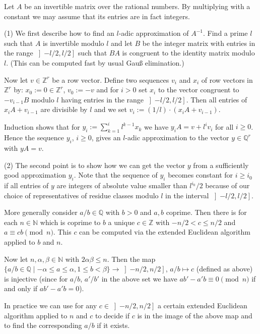 \documentclass[a4paper,11pt]{report}
\begin{document}
{{ Let $A$ be an invertible matrix over the rational numbers. By multiplying with a
constant we may assume that its entries are in fact integers.

 (1) We first describe how to find an $l$-adic approximation of $A^{-1}$. Find a prime $l$ such that $A$ is invertible modulo $l$ and let $B$ be the integer matrix with entries in the range $\left]-l/2,l/2\right]$ such that $BA$ is congruent to the identity matrix modulo $l$. (This can be computed fast by usual Gau{\ss} elimination.)

 Now let $v \in {\ensuremath{\mathbb Z}}^r$ be a row vector. Define two sequences $v_i$ and $x_i$ of row vectors in ${\ensuremath{\mathbb Z}}^r$ by: $x_0 := 0 \in {\ensuremath{\mathbb Z}}^r$, $v_0 := -v$ and for $i > 0$ set $x_i$ to the vector congruent to $-v_{i-1} B$ modulo $l$ having entries in the range $\left]-l/2, l/2\right]$. Then all entries of $x_i A + v_{i-1}$ are divisible by $l$ and we set $v_i := (1/l) \cdot (x_i A + v_{i-1})$.

 Induction shows that for $y_i := \sum_{k=1}^{i} l^{k-1} x_k$ we have $y_i A = v + l^i v_i$ for all $i \geq 0$. Hence the sequence $y_i$, $i \geq 0$, gives an $l$-adic approximation to the vector $y \in {\ensuremath{\mathbb Q}}^r$ with $y A = v$.

 (2) The second point is to show how we can get the vector $y$ from a sufficiently good approximation $y_i$. Note that the sequence of $y_i$ becomes constant for $i \geq i_0$ if all entries of $y$ are integers of absolute value smaller than $l^{i_0} / 2$ because of our choice of representatives of residue classes modulo $l$ in the interval $\left]-l/2, l/2\right]$.

 More generally consider $a / b \in {\ensuremath{\mathbb Q}}$ with $b > 0$ and $a, b$ coprime. Then there is for each $n \in {\ensuremath{\mathbb N}}$ which is coprime to $b$ a unique $c \in {\ensuremath{\mathbb Z}}$ with $-n / 2 < c \leq n / 2$ and $a \equiv c b \pmod{n}$. This $c$ can be computed via the extended Euclidean algorithm applied to $b$ and $n$.

 Now let $n, \alpha, \beta \in {\ensuremath{\mathbb N}}$ with $2 \alpha \beta \leq n$. Then the map $\{a/b \in {\ensuremath{\mathbb Q}} \mid -\alpha \leq a \leq \alpha, 1 \leq b <
\beta \} \rightarrow \left]-n/2, n/2\right]$, $a/b \mapsto c$ (defined as above) is injective (since for $a/b$, $a'/b'$ in the above set we have $a b' - a' b \equiv 0 \pmod{n}$ if and only if $a b' - a' b = 0$).

 In practice we can use for any $c \in \left]-n/2, n/2\right]$ a certain extended Euclidean algorithm applied to $n$ and $c$ to decide if $c$ is in the image of the above map and to find the corresponding $a/b$ if it exists.

}}
\end{document}
